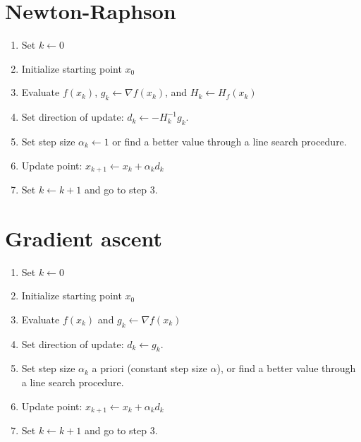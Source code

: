 \documentclass[12pt]{article}
\begin{document}
\section{Newton-Raphson}
\begin{enumerate}
	\item Set $k \leftarrow 0$
	\item Initialize starting point $x_0$
	\item Evaluate $f(x_k)$, $g_k \leftarrow \nabla f(x_k)$, and $H_k \leftarrow H_f(x_k)$
	\item Set direction of update: $d_{k} \leftarrow -H^{-1}_{k} g_k $.
	\item Set step size $\alpha_k \leftarrow 1$ or find a better value through a line search procedure.
	\item Update point: $x_{k+1} \leftarrow x_k + \alpha_k d_k$
	\item Set $k \leftarrow k + 1$ and go to step 3.
\end{enumerate}


\section{Gradient ascent}
\begin{enumerate}
	\item Set $k \leftarrow 0$
	\item Initialize starting point $x_0$
	\item Evaluate $f(x_k)$ and $g_k \leftarrow \nabla f(x_k)$
	\item Set direction of update: $d_{k} \leftarrow g_k $.
	\item Set step size $\alpha_k$ a priori (constant step size $\alpha$), or find a better value through a line search procedure.
	\item Update point: $x_{k+1} \leftarrow x_k + \alpha_k d_k$
	\item Set $k \leftarrow k + 1$ and go to step 3.
\end{enumerate}




\end{document}
